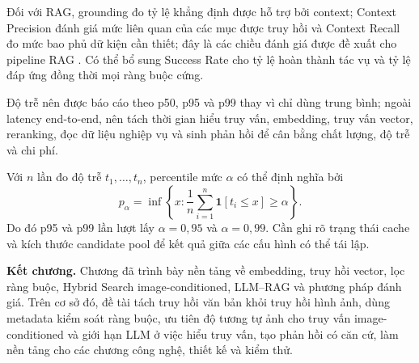 Đối với RAG, grounding đo tỷ lệ khẳng định được hỗ trợ bởi context; Context Precision
đánh giá mức liên quan của các mục được truy hồi và Context Recall đo mức bao phủ dữ
kiện cần thiết; đây là các chiều đánh giá được đề xuất cho pipeline RAG
\parencite{es2024ragas}. Có thể bổ sung Success Rate cho tỷ lệ hoàn thành tác vụ và tỷ lệ đáp ứng
đồng thời mọi ràng buộc cứng.

Độ trễ nên được báo cáo theo p50, p95 và p99 thay vì chỉ dùng trung bình; ngoài latency
end-to-end, nên tách thời gian hiểu truy vấn, embedding, truy vấn vector, reranking, đọc
dữ liệu nghiệp vụ và sinh phản hồi để cân bằng chất lượng, độ trễ và chi phí.

Với $n$ lần đo độ trễ $t_1,\ldots,t_n$, percentile mức $\alpha$ có thể định nghĩa bởi
\begin{equation}
    p_{\alpha}=\inf\left\{x:\frac{1}{n}\sum_{i=1}^{n}
    \mathbf{1}[t_i\le x]\ge\alpha\right\}.
    \label{eq:latency_percentile}
\end{equation}
Do đó p95 và p99 lần lượt lấy $\alpha=0{,}95$ và $\alpha=0{,}99$. Cần ghi rõ trạng thái
cache và kích thước candidate pool để kết quả giữa các cấu hình có thể tái lập.

\medskip\noindent\textbf{Kết chương.}
Chương đã trình bày nền tảng về embedding, truy hồi vector, lọc ràng buộc, Hybrid Search
image-conditioned, LLM--RAG và phương pháp đánh giá. Trên cơ sở đó, đề tài tách truy
hồi văn bản khỏi truy hồi hình ảnh, dùng metadata kiểm soát ràng buộc, ưu tiên độ tương
tự ảnh cho truy vấn image-conditioned và giới hạn LLM ở việc hiểu truy vấn, tạo phản
hồi có căn cứ, làm nền tảng cho các chương công nghệ, thiết kế và kiểm thử.
